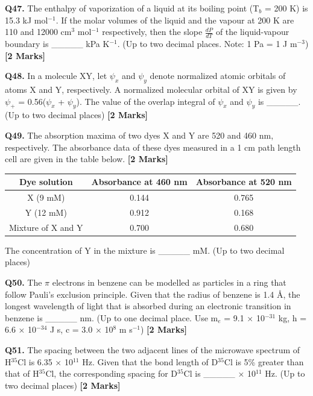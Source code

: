 \documentclass[11pt]{article}
\newcommand{\questionb}[2]{
    \noindent\textbf{Q#2.} #1 \hfill \textbf{[2 Marks]}
}
\begin{document}
\questionb{The enthalpy of vaporization of a liquid at its boiling point (T$_b$ = 200 K) is 15.3 kJ mol$^{-1}$. If the molar volumes of the liquid and the vapour at 200 K are 110 and 12000 cm$^3$ mol$^{-1}$ respectively, then the slope $\frac{dP}{dT}$ of the liquid-vapour boundary is \_\_\_\_\_ kPa K$^{-1}$. (Up to two decimal places. Note: 1 Pa = 1 J m$^{-3}$)}{47}
\vspace{0.5cm}

\questionb{In a molecule XY, let $\psi_x$ and $\psi_y$ denote normalized atomic orbitals of atoms X and Y, respectively. A normalized molecular orbital of XY is given by $\psi_+$ = 0.56($\psi_x$ + $\psi_y$). The value of the overlap integral of $\psi_x$ and $\psi_y$ is \_\_\_\_\_. (Up to two decimal places)}{48}
\vspace{0.5cm}

\questionb{The absorption maxima of two dyes X and Y are 520 and 460 nm, respectively. The absorbance data of these dyes measured in a 1 cm path length cell are given in the table below.}{49}
\begin{center}
\begin{tabular}{|c|c|c|}
\hline
Dye solution & Absorbance at 460 nm & Absorbance at 520 nm \\
\hline
X (9 mM) & 0.144 & 0.765 \\
Y (12 mM) & 0.912 & 0.168 \\
Mixture of X and Y & 0.700 & 0.680 \\
\hline
\end{tabular}
\end{center}
The concentration of Y in the mixture is \_\_\_\_\_ mM. (Up to two decimal places)
\vspace{0.5cm}

\questionb{The $\pi$ electrons in benzene can be modelled as particles in a ring that follow Pauli's exclusion principle. Given that the radius of benzene is 1.4 Å, the longest wavelength of light that is absorbed during an electronic transition in benzene is \_\_\_\_\_ nm. (Up to one decimal place. Use m$_e$ = 9.1 × 10$^{-31}$ kg, h = 6.6 × 10$^{-34}$ J s, c = 3.0 × 10$^8$ m s$^{-1}$)}{50}
\vspace{0.5cm}

\questionb{The spacing between the two adjacent lines of the microwave spectrum of H$^{35}$Cl is 6.35 × 10$^{11}$ Hz. Given that the bond length of D$^{35}$Cl is 5\% greater than that of H$^{35}$Cl, the corresponding spacing for D$^{35}$Cl is \_\_\_\_\_ × 10$^{11}$ Hz. (Up to two decimal places)}{51}
\vspace{0.5cm}
\end{document}
